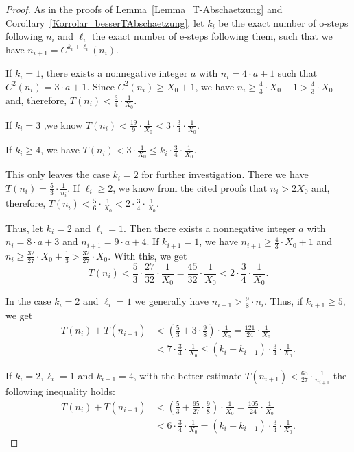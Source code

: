 \documentclass[12pt,reqno]{article}
\begin{document}
\begin{proof}
As in the proofs of Lemma~\ref{Lemma_T-Abschaetzung} and Corollary~\ref{Korrolar_besserTAbschaetzung}, let $k_i$ be the exact number of o-steps following $n_i$ and $\ell_i$ the exact number of e-steps following them, such that we have $n_{i+1}=C^{k_i+\ell_i}(n_i)$.

If $k_i=1$, there exists a nonnegative integer $a$ with $n_i=4\cdot a + 1$ such that $C^2(n_i)=3\cdot a +1$. Since $C^2(n_i)\geq X_0+1$, we have $n_i\geq \tfrac{4}{3} \cdot X_0 + 1>\tfrac{4}{3} \cdot X_0$ and, therefore, $T(n_i)<\tfrac{3}{4} \cdot \tfrac{1}{X_0}$.

If $k_i=3$ ,we know $T(n_i)<\tfrac{19}{9} \cdot \tfrac{1}{X_0}<3 \cdot \tfrac{3}{4} \cdot \tfrac{1}{X_0}$.

If $k_i\geq 4$, we have $T(n_i)<3 \cdot \tfrac{1}{X_0} \leq k_i \cdot \tfrac{3}{4} \cdot \tfrac{1}{X_0}$.

This only leaves the case $k_i=2$ for further investigation. There we have $T(n_i)=\tfrac{5}{3} \cdot\tfrac{1}{n_i}$. If $\ell_i\geq 2$, we know from the cited proofs that $n_i>2X_0$ and, therefore, $T(n_i) <\tfrac{5}{6} \cdot\tfrac{1}{X_0}<2 \cdot \tfrac{3}{4} \cdot \tfrac{1}{X_0}$. 

Thus, let $k_i=2$ and $\ell_i=1$. Then there exists a nonnegative integer $a$ with $n_i=8\cdot a + 3$ and $n_{i+1}=9 \cdot a + 4$. If $k_{i+1}=1$, we have $n_{i+1}\geq \tfrac{4}{3} \cdot X_0 + 1$ and $n_i\geq \tfrac{32}{27} \cdot X_0 + \tfrac{1}{3}>\tfrac{32}{27} \cdot X_0$. With this, we get
\[T(n_i)< \frac{5}{3} \cdot \frac{27}{32} \cdot \frac{1}{X_0}=\frac{45}{32}\cdot \frac{1}{X_0} < 2 \cdot \frac{3}{4} \cdot\frac{1}{X_0}.\]

In the case $k_i=2$ and $\ell_i=1$ we generally have $n_{i+1} > \tfrac{9}{8} \cdot n_{i}$. Thus, if $k_{i+1}\geq 5$, we get
\begin{align*}
T(n_i)+T(n_{i+1})&<\left( \frac{5}{3} + 3 \cdot \frac{9}{8}\right)\cdot \frac{1}{X_0} = \frac{121}{24} \cdot \frac{1}{X_0}\\
\quad &<7 \cdot \frac{3}{4}\cdot \frac{1}{X_0} \leq (k_i+k_{i+1}) \cdot \frac{3}{4}\cdot \frac{1}{X_0}.
\end{align*}

If $k_i=2, \ell_i=1$ and $k_{i+1}=4$, with the better estimate $T(n_{i+1})<\tfrac{65}{27} \cdot \tfrac{1}{n_{i+1}}$ the following inequality holds:
\begin{align*}
T(n_i)+T(n_{i+1})&<\left( \frac{5}{3} + \frac{65}{27} \cdot \frac{9}{8}\right)\cdot \frac{1}{X_0} = \frac{105}{24} \cdot \frac{1}{X_0}\\
\quad &<6 \cdot \frac{3}{4}\cdot \frac{1}{X_0} = (k_i+k_{i+1}) \cdot \frac{3}{4}\cdot \frac{1}{X_0}.
\end{align*}


\end{proof}
\end{document}
